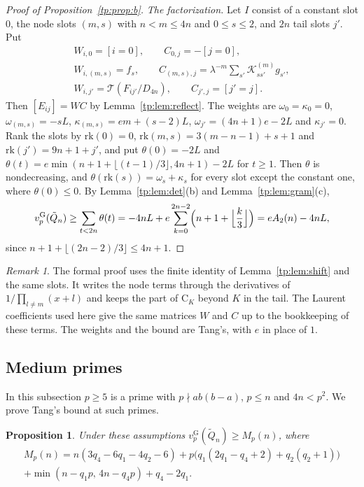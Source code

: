 \documentclass[11pt]{amsart}
\newtheorem{proposition}[theorem]{Proposition}
\theoremstyle{definition}
\theoremstyle{remark}
\newtheorem{remark}[theorem]{Remark}
\numberwithin{equation}{section}
\newcommand{\vG}{v_p^{\mathrm G}}
\begin{document}
\begin{proof}[Proof of Proposition~\ref{tp:prop:b}]
\emph{The factorization.} Let $I$ consist of a constant slot $0$, the node slots $(m,s)$ with $n<m\le4n$ and
$0\le s\le2$, and $2n$ tail slots $j'$. Put
\begin{gather*}
 W_{i,0}=[i=0],\qquad C_{0,j}=-[j=0],\\
 W_{i,(m,s)}=f_s,\qquad C_{(m,s),j}=\lambda^{-m}\sum_{s'}\mathcal K^{(m)}_{ss'}g_{s'},\\
 W_{i,j'}=\mathcal T(F_{ij'}/D_{4n}),\qquad C_{j',j}=[j'=j].
\end{gather*}
Then $[E_{ij}]=WC$ by Lemma~\ref{tp:lem:reflect}. The weights are $\omega_0=\kappa_0=0$,
$\omega_{(m,s)}=-sL$, $\kappa_{(m,s)}=em+(s-2)L$, $\omega_{j'}=(4n+1)e-2L$ and $\kappa_{j'}=0$. Rank the slots by
$\mathrm{rk}(0)=0$, $\mathrm{rk}(m,s)=3(m-n-1)+s+1$ and $\mathrm{rk}(j')=9n+1+j'$, and put $\theta(0)=-2L$ and
$\theta(t)=e\min(n+1+\lfloor(t-1)/3\rfloor,4n+1)-2L$ for $t\ge1$. Then $\theta$ is nondecreasing, and
$\theta(\mathrm{rk}(s))=\omega_s+\kappa_s$ for every slot except the constant one, where $\theta(0)\le0$. By
Lemma~\ref{tp:lem:det}(b) and Lemma~\ref{tp:lem:gram}(c),
\[
 \vG(\tilde Q_n)\ge\sum_{t<2n}\theta(t)=-4nL+e\sum_{k=0}^{2n-2}\Bigl(n+1+\Bigl\lfloor\frac k3\Bigr\rfloor\Bigr)=eA_2(n)-4nL,
\]
since $n+1+\lfloor(2n-2)/3\rfloor\le4n+1$.
\end{proof}

\begin{remark}\label{tp:rem:b}
The formal proof uses the finite identity of Lemma~\ref{tp:lem:shift} and the same slots. It writes the node terms
through the derivatives of $1/\prod_{l\ne m}(x+l)$ and keeps the part of $\mathrm C_K$ beyond $K$ in the tail. The
Laurent coefficients used here give the same matrices $W$ and $C$ up to the bookkeeping of these terms. The weights and
the bound are Tang's, with $e$ in place of $1$.
\end{remark}

\subsection{Medium primes}\label{tp:ssec:medium}
In this subsection $p\ge5$ is a prime with $p\nmid ab(b-a)$, $p\le n$ and $4n<p^2$. We prove Tang's bound at such
primes.

\begin{proposition}\label{tp:prop:medium}
Under these assumptions $\vG(\tilde Q_n)\ge M_p(n)$, where
\begin{multline*}
 M_p(n)=n(3q_4-6q_1-4q_2-6)+p\bigl(q_1(2q_1-q_4+2)+q_2(q_2+1)\bigr)\\
 +\min(n-q_1p,\,4n-q_4p)+q_4-2q_1 .
\end{multline*}
\end{proposition}
\end{document}

